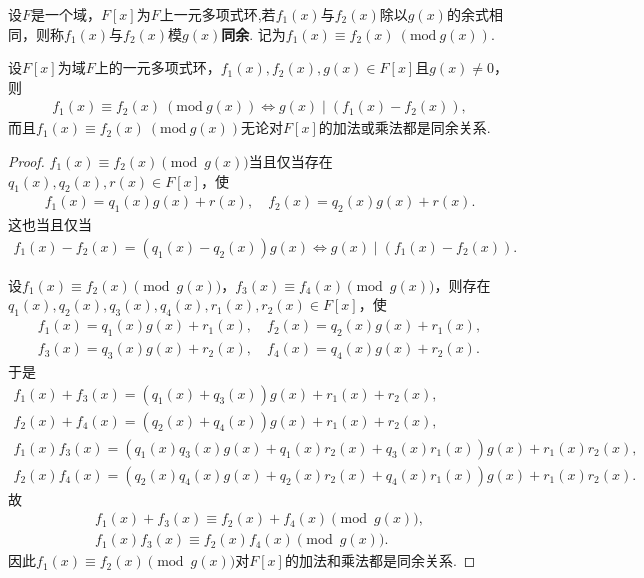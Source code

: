 \documentclass[../../main.tex]{subfiles}%
\begin{document}
\begin{definition}
设$F$是一个域，$F[x]$为$F$上一元多项式环,若$f_1(x)$与$f_2(x)$除以$g(x)$的余式相同，则称$f_1(x)$与$f_2(x)$模$g(x)$\textbf{同余}. 记为$f_1(x) \equiv f_2(x)\ (\mathrm{mod}\ g(x))$.
\end{definition}

\begin{corollary}\label{corollary:抽象代数--推论2.6.1}
设$F[x]$为域$F$上的一元多项式环，$f_1(x), f_2(x), g(x) \in F[x]$且$g(x) \neq 0$，则
\begin{align*}
f_1(x) \equiv f_2(x)\ (\mathrm{mod}\ g(x))\iff g(x) \mid (f_1(x) - f_2(x)),
\end{align*}
而且$f_1(x) \equiv f_2(x)\ (\mathrm{mod}\ g(x))$无论对$F[x]$的加法或乘法都是同余关系.
\end{corollary}
\begin{proof}
$f_1(x) \equiv f_2(x) \pmod{g(x)}$当且仅当存在$q_1(x), q_2(x), r(x) \in F[x]$，使
\begin{align*}
f_1(x) = q_1(x)g(x) + r(x),\quad f_2(x) = q_2(x)g(x) + r(x).
\end{align*}
这也当且仅当
\begin{align*}
f_1(x) - f_2(x) = (q_1(x) - q_2(x))g(x) \iff g(x) \mid (f_1(x) - f_2(x)).
\end{align*}

设$f_1(x) \equiv f_2(x) \pmod{g(x)}$，$f_3(x) \equiv f_4(x) \pmod{g(x)}$，则存在$q_1(x), q_2(x), q_3(x), q_4(x), r_1(x), r_2(x) \in F[x]$，使
\begin{align*}
f_1(x) = q_1(x)g(x) + r_1(x),\quad f_2(x) = q_2(x)g(x) + r_1(x),\\
f_3(x) = q_3(x)g(x) + r_2(x),\quad f_4(x) = q_4(x)g(x) + r_2(x).
\end{align*}
于是
\begin{gather*}
f_1(x) + f_3(x) = (q_1(x) + q_3(x))g(x) + r_1(x) + r_2(x),\\
f_2(x) + f_4(x) = (q_2(x) + q_4(x))g(x) + r_1(x) + r_2(x),\\
f_1(x)f_3(x) = (q_1(x)q_3(x)g(x) + q_1(x)r_2(x) + q_3(x)r_1(x))g(x) + r_1(x)r_2(x),\\
f_2(x)f_4(x) = (q_2(x)q_4(x)g(x) + q_2(x)r_2(x) + q_4(x)r_1(x))g(x) + r_1(x)r_2(x).
\end{gather*}
故
\begin{align*}
f_1(x) + f_3(x) \equiv f_2(x) + f_4(x) \pmod{g(x)},\\
f_1(x)f_3(x) \equiv f_2(x)f_4(x) \pmod{g(x)}.
\end{align*}
因此$f_1(x) \equiv f_2(x) \pmod{g(x)}$对$F[x]$的加法和乘法都是同余关系.
\end{proof}
\end{document}
